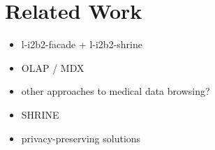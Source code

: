 \section{Related Work}
\begin{itemize}
    \item l-i2b2-facade + l-i2b2-shrine
    \item OLAP / MDX
    \item other approaches to medical data browsing?
    \item SHRINE
    \item privacy-preserving solutions
\end{itemize}




